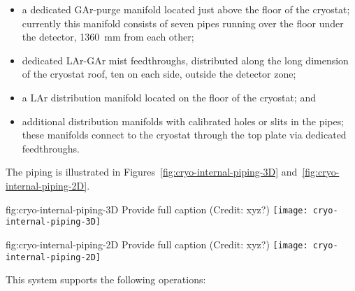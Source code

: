 \begin{itemize}
\item a dedicated GAr-purge manifold located just above the floor of the cryostat; currently this manifold consists of seven pipes running over the floor under the detector, \SI{1360}{mm} from each other;
\item dedicated LAr-GAr mist feedthroughs, distributed along the long dimension of the cryostat roof, ten on each side, outside the detector zone;
\item a LAr distribution manifold located on the floor of the cryostat; and
\item additional distribution manifolds with calibrated holes or slits in the pipes;
these manifolds connect to the cryostat through the top plate via dedicated feedthroughs.
\end{itemize}

The piping is illustrated in Figures~\ref{fig:cryo-internal-piping-3D} and~\ref{fig:cryo-internal-piping-2D}.
\begin{dunefigure}{fig:cryo-internal-piping-3D}
     {Provide full caption (Credit: xyz?)}
    \texttt{[image: cryo-internal-piping-3D]}
\end{dunefigure}

\begin{dunefigure}{fig:cryo-internal-piping-2D}
     {Provide full caption (Credit: xyz?)}
    \texttt{[image: cryo-internal-piping-2D]}
\end{dunefigure}

This system supports the following operations:

